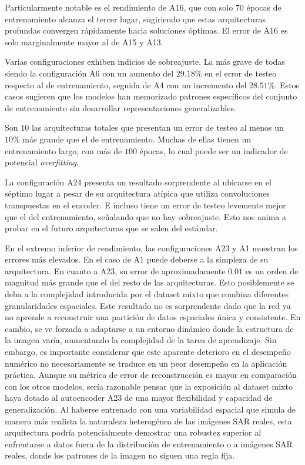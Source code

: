 Particularmente notable es el rendimiento de A16, que con solo $70$ épocas de entrenamiento alcanza el tercer lugar, sugiriendo que estas arquitecturas profundas convergen rápidamente hacia soluciones óptimas. El error de A16 es solo marginalmente mayor al de A15 y A13.


Varias configuraciones exhiben indicios de sobreajuste. La más grave de todas siendo la configuración A6 con un aumento del $29.18\%$ en el error de testeo respecto al de entrenamiento, seguida de A4 con un incremento del $28.51\%$. Estos casos sugieren que los modelos han memorizado patrones específicos del conjunto de entrenamiento sin desarrollar representaciones generalizables.

Son $10$ las arquitecturas totales que presentan un error de testeo al menos un $10\%$ más grande que el de entrenamiento. Muchas de ellas tienen un entrenamiento largo, con más de $100$ épocas, lo cual puede ser un indicador de potencial \emph{overfitting}.


La configuración A24 presenta un resultado sorprendente al ubicarse en el séptimo lugar a pesar de su arquitectura atípica que utiliza convoluciones transpuestas en el encoder. E incluso tiene un error de testeo levemente mejor que el del entrenamiento, señalando que no hay sobreajuste. Esto nos anima a probar en el futuro arquitecturas que se salen del estándar.

En el extremo inferior de rendimiento, las configuraciones A23 y A1 muestran los errores más elevados. En el caso de A1 puede deberse a la simpleza de su arquitectura. En cuanto a A23, su error de aproximadamente $0.01$ es un orden de magnitud más grande que el del resto de las arquitecturas. Esto posiblemente se deba a la complejidad introducida por el dataset mixto que combina diferentes granularidades espaciales. Este resultado no es sorprendente dado que la red ya no aprende a reconstruir una partición de datos espaciales única y consistente. En cambio, se ve forzada a adaptarse a un entorno dinámico donde la estructura de la imagen varía, aumentando la complejidad de la tarea de aprendizaje. Sin embargo, es importante considerar que este aparente deterioro en el desempeño numérico no necesariamente se traduce en un peor desempeño en la aplicación práctica. Aunque su métrica de error de reconstrucción es mayor en comparación con los otros modelos, sería razonable pensar que la exposición al dataset mixto haya dotado al autoencoder A23 de una mayor flexibilidad y capacidad de generalización. Al haberse entrenado con una variabilidad espacial que simula de manera más realista la naturaleza heterogénea de las imágenes SAR reales, esta arquitectura podría potencialmente demostrar una robustez superior al enfrentarse a datos fuera de la distribución de entrenamiento o a imágenes SAR reales, donde los patrones de la imagen no siguen una regla fija.

